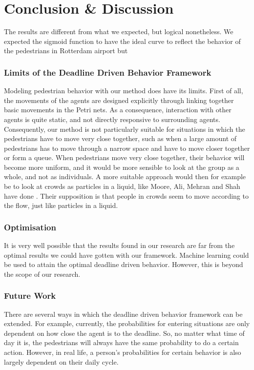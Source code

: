 \documentclass[11pt]{book}
\begin{document}
\chapter{Conclusion \& Discussion}
The results are different from what we expected, but logical nonetheless. We expected the sigmoid function to have the ideal curve to reflect the behavior of the pedestrians in Rotterdam airport but


\subsection{Limits of the Deadline Driven Behavior Framework}
Modeling pedestrian behavior with our method does have its limits. First of all, the movements of the agents are designed explicitly through linking together basic movements in the Petri nets. As a consequence, interaction with other agents is quite static, and not directly responsive to surrounding agents. Consequently, our method is not particularly suitable for situations in which the pedestrians have to move very close together, such as when a large amount of pedestrians has to move through a narrow space and have to move closer together or form a queue. When pedestrians move very close together, their behavior will become more uniform, and it would be more sensible to look at the group as a whole, and not as individuals. A more suitable approach would then for example be to look at crowds as particles in a liquid, like Moore, Ali, Mehran and Shah have done \cite{Moore:2011:VCS:2043174.2043192}. Their supposition is that people in crowds seem to move according to the flow, just like particles in a liquid.

\subsection{Optimisation}
It is very well possible that the results found in our research are far from the optimal results we could have gotten with our framework.  Machine learning could be used to attain the optimal deadline driven behavior. However, this is beyond the scope of our research.

\subsection{Future Work}
There are several ways in which the deadline driven behavior framework can be extended. For example, currently, the probabilities for entering situations are only dependent on how close the agent is to the deadline. So, no matter what time of day it is, the pedestrians will always have the same probability to do a certain action. However, in real life, a person's probabilities for certain behavior is also largely dependent on their daily cycle.
\end{document}
